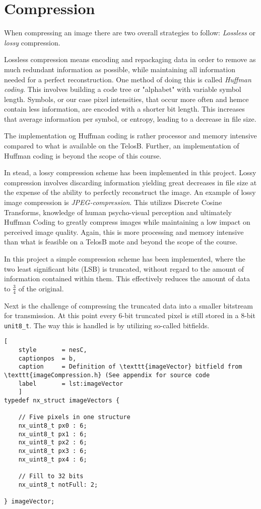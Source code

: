 \section{Compression}
When compressing an image there are two overall strategies to follow:
\emph{Lossless} or \emph{lossy} compression.

Lossless compression means encoding and repackaging data in order to remove as much redundant information as possible, while maintaining all information needed for a perfect reconstruction. 
One method of doing this is called \emph{Huffman coding}.
This involves building a code tree or "alphabet" with variable symbol length.
Symbols, or our case pixel intensities, that occur more often and hemce contain less information, are encoded with a shorter bit length. 
This increases that average information per symbol, or entropy, leading to a decrease in file size.

The implementation og Huffman coding is rather processor and memory intensive compared to what is available on the TelosB.
Further, an implementation of Huffman coding is beyond the scope of this course.

In stead, a lossy compression scheme has been implemented in this project.
Lossy compression involves discarding information yielding great decreases in file size at the expense of the ability to perfectly reconstruct the image.
An example of lossy image compression is \emph{JPEG-compression}.
This utilizes Discrete Cosine Transforms, knowledge of human psycho-visual perception and ultimately Huffman Coding to greatly compress images while maintaining a low impact on perceived image quality.
Again, this is more processing and memory intensive than what is feasible on a TelosB mote and beyond the scope of the course.

In this project a simple compression scheme has been implemented, where the two least significant  bits (LSB) is truncated, without regard to the amount of information contained within them.
This effectively reduces the amount of data to $ \frac{3}{4} $ of the original. 

Next is the challenge of compressing the truncated data into a smaller bitstream for transmission.
At this point every 6-bit truncated pixel is still stored in a 8-bit \texttt{unit8\_t}.
The way this is handled is by utilizing so-called bitfields.

\begin{lstlisting}[
	style		= nesC, 
	captionpos	= b, 
	caption		= Definition of \texttt{imageVector} bitfield from \texttt{imageCompression.h} (See appendix for source code
	label		= lst:imageVector
	]
typedef nx_struct imageVectors {
	
	// Five pixels in one structure
	nx_uint8_t px0 : 6;
	nx_uint8_t px1 : 6;
	nx_uint8_t px2 : 6;
	nx_uint8_t px3 : 6;
	nx_uint8_t px4 : 6;
	
	// Fill to 32 bits
	nx_uint8_t notFull: 2;
	
} imageVector;

\end{lstlisting}

